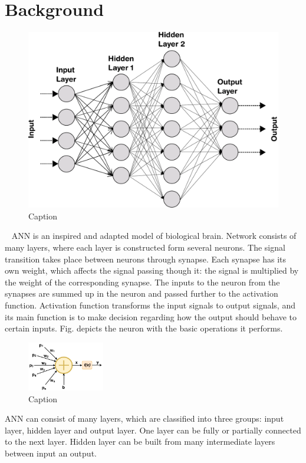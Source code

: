 \section{Background}

\begin{figure}[t!]
    \centering
    \includegraphics[width = 0.8\columnwidth]{Figures/NeuralNetwork.pdf}
    \caption{Caption}
    \label{fig:my_label}
\end{figure}


~\cite{Furber2013}
ANN is an inspired and adapted model of biological brain. Network consists of many layers, where each layer is constructed form several neurons. The signal transition takes place between neurons through synapse. Each synapse has its own weight, which affects the signal passing though it: the signal is multiplied by the weight of the corresponding synapse. The inputs to the neuron from the synapses are summed up in the neuron and passed further to the activation function. Activation function transforms the input signals to output signals, and its main function is to make decision regarding how the output should behave to certain inputs. Fig. depicts the neuron with the basic operations it performs. 


\begin{figure}[t!]
    \centering
    \includegraphics[width = 0.3\textwidth]{Figures/ANN.pdf}
    \caption{Caption}
    \label{fig:my_label}
\end{figure}

ANN can consist of many layers, which are classified into three groups: input layer, hidden layer and output layer. One layer can be fully or partially connected to the next layer. Hidden layer can be built from many intermediate layers between input an output. 

